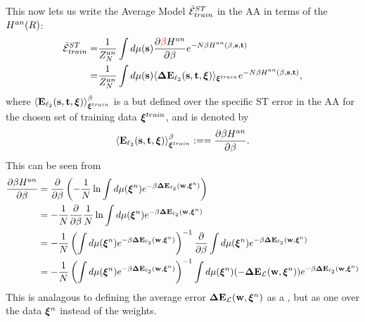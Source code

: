 %
This now lets us write the Average Model \TrainingError $\bar{\mathcal{E}}^{ST}_{train}$ in the AA in terms of the \AnnealedHamiltonian $H^{an}(R)$:
  \begin{align}
  \nonumber
  \bar{\mathcal{E}}^{ST}_{train}
   =& \dfrac{1}{Z^{an}_{N}}\int d\mu({\mathbf{s}})\dfrac{\partial {\color{red}\sf{\beta}}H^{an}}{\partial \beta} e^{-N\beta H^{an}(\beta,{\mathbf{s}},{\mathbf{t}})} \\ 
  \label{eqn:EtM2}
   =& \dfrac{1}{Z^{an}_{N}}\int d\mu({\mathbf{s}})\langle  \mathbf{\Delta E}_{\ell_2}({\mathbf{s}},{\mathbf{t}},\boldsymbol{\xi}) \rangle_{\boldsymbol{\xi}^{train}} e^{-N\beta H^{an}(\beta,{\mathbf{s}},{\mathbf{t}})}  ,
  \end{align}
  where $\langle \mathbf{E}_{\ell_2}({\mathbf{s}},{\mathbf{t}},\boldsymbol{\xi}) \rangle^{\beta}_{\boldsymbol{\xi}^{train}}$
  is a \ThermalAverage but defined over the specific ST error in the AA for the chosen set of training data $\boldsymbol{\xi}^{train}$, and is denoted by 
 \begin{align}
   \langle  \mathbf{E}_{\ell_2}({\mathbf{s}},{\mathbf{t}},\boldsymbol{\xi}) \rangle^{\beta}_{\boldsymbol{\xi}^{train}}:==\dfrac{\partial \beta H^{an}}{\partial \beta}.
 \end{align}
 This can be seen from
 \begin{align}
  \label{eqn:partial_Gan}
  \dfrac{\partial \beta H^{an}}{\partial \beta}
  &=  \dfrac{\partial }{\partial \beta} \left(-\frac{1}{N}\ln \int d\mu(\boldsymbol{\xi}^{n})e^{-\beta\mathbf{\Delta {E}}_{\ell_2}(\mathbf{w}, \boldsymbol{\xi}^{n})}\right) \\ \nonumber
  &=  -\frac{1}{N}\dfrac{\partial }{\partial \beta} \frac{1}{N}\ln \int d\mu(\boldsymbol{\xi}^{n})e^{-\beta\mathbf{\Delta {E}}_{\ell_2}(\mathbf{w}, \boldsymbol{\xi}^{n})} \\ \nonumber
  &=  -\frac{1}{N} \left( \int d\mu(\boldsymbol{\xi}^{n})e^{-\beta\mathbf{\Delta {E}}_{\ell_2}(\mathbf{w}, \boldsymbol{\xi}^{n})}\right)^{-1}\dfrac{\partial }{\partial \beta} \int d\mu(\boldsymbol{\xi}^{n})e^{-\beta\mathbf{\Delta {E}}_{\ell_2}(\mathbf{w}, \boldsymbol{\xi}^{n})} \\ \nonumber
    &=  -\frac{1}{N} \left(\int d\mu(\boldsymbol{\xi}^{n})e^{-\beta\mathbf{\Delta {E}}_{\ell_2}(\mathbf{w}, \boldsymbol{\xi}^{n})}\right)^{-1} \int d\mu(\boldsymbol{\xi}^{n})(-\mathbf{\Delta {E}}_{\mathcal{L}}(\mathbf{w}, \boldsymbol{\xi}^{n}))e^{-\beta\mathbf{\Delta {E}}_{\ell_2}(\mathbf{w}, \boldsymbol{\xi}^{n})}
 \end{align}
This is analagous to defining the average error $\mathbf{\Delta {E}}_{\mathcal{L}}(\mathbf{w}, \boldsymbol{\xi}^{n})$ as a \ThermalAverage, but as one over the data $\boldsymbol{\xi}^{n}$ instead of the weights.

